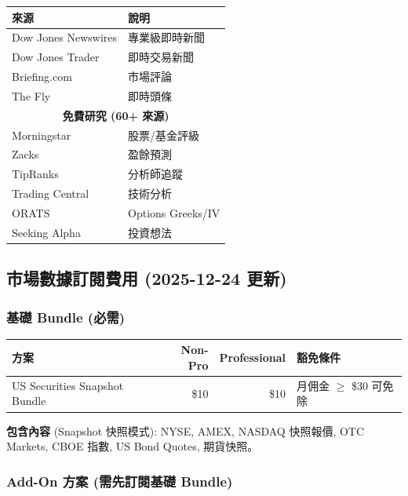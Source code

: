 \documentclass[11pt,a4paper]{article}
\begin{document}
\begin{table}[H]
\centering
\begin{tabular}{@{}ll@{}}
\toprule
\textbf{來源} & \textbf{說明} \\
\midrule
Dow Jones Newswires & 專業級即時新聞 \\
Dow Jones Trader & 即時交易新聞 \\
Briefing.com & 市場評論 \\
The Fly & 即時頭條 \\
\midrule
\multicolumn{2}{c}{\textbf{免費研究 (60+ 來源)}} \\
\midrule
Morningstar & 股票/基金評級 \\
Zacks & 盈餘預測 \\
TipRanks & 分析師追蹤 \\
Trading Central & 技術分析 \\
ORATS & Options Greeks/IV \\
Seeking Alpha & 投資想法 \\
\bottomrule
\end{tabular}
\end{table}

\subsection{市場數據訂閱費用 (2025-12-24 更新)}

\subsubsection{基礎 Bundle (必需)}

\begin{table}[H]
\centering
\begin{tabular}{@{}lrrp{5cm}@{}}
\toprule
\textbf{方案} & \textbf{Non-Pro} & \textbf{Professional} & \textbf{豁免條件} \\
\midrule
US Securities Snapshot Bundle & \$10 & \$10 & 月佣金 $\geq$ \$30 可免除 \\
\bottomrule
\end{tabular}
\end{table}

\textbf{包含內容} (Snapshot 快照模式): NYSE, AMEX, NASDAQ 快照報價, OTC Markets, CBOE 指數, US Bond Quotes, 期貨快照。

\subsubsection{Add-On 方案 (需先訂閱基礎 Bundle)}
\end{document}
